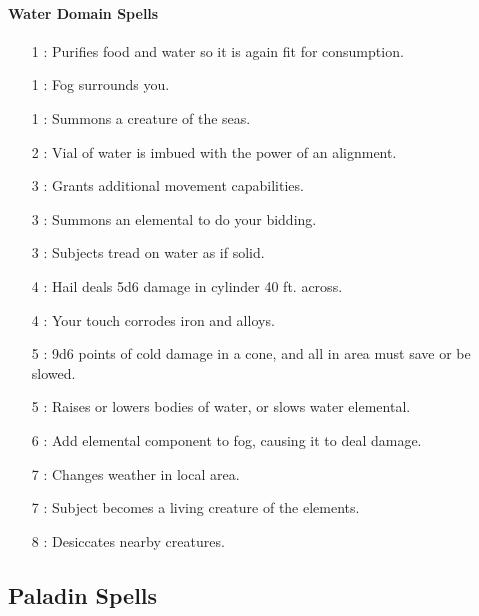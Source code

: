 \paragraph{Water Domain Spells}
\begin{itemize}
\item[1] : Purifies food and water so it is again fit for consumption.
\item[1] : Fog surrounds you.
\item[1] : Summons a creature of the seas.
\item[2] : Vial of water is imbued with the power of an alignment.
\item[3] : Grants additional movement capabilities.
\item[3] : Summons an elemental to do your bidding.
\item[3] : Subjects tread on water as if solid.
\item[4] : Hail deals 5d6 damage in cylinder 40 ft. across.
\item[4] : Your touch corrodes iron and alloys.
\item[5] : 9d6 points of cold damage in a cone, and all in area must save or be slowed.
\item[5] : Raises or lowers bodies of water, or slows water elemental.
\item[6] : Add elemental component to fog, causing it to deal damage.
\item[7] : Changes weather in local area.
\item[7] : Subject becomes a living creature of the elements.
\item[8] : Desiccates nearby creatures.
\end{itemize}
\subsection{Paladin Spells}
